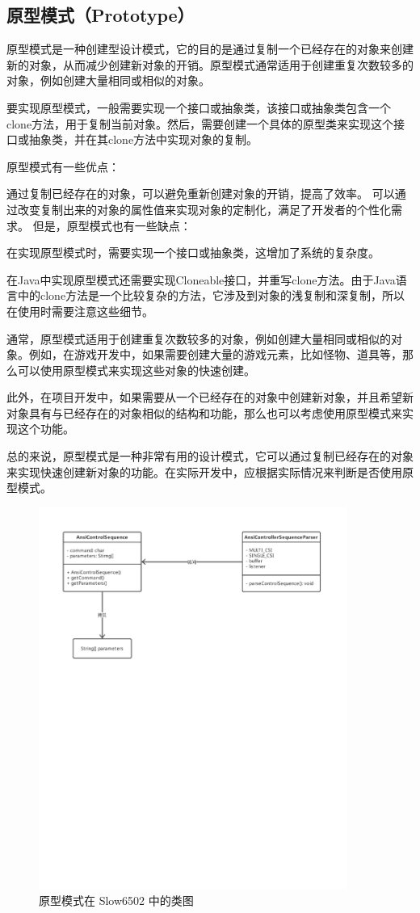 \subsection{原型模式（Prototype）}

原型模式是一种创建型设计模式，它的目的是通过复制一个已经存在的对象来创建新的对象，从而减少创建新对象的开销。原型模式通常适用于创建重复次数较多的对象，例如创建大量相同或相似的对象。

要实现原型模式，一般需要实现一个接口或抽象类，该接口或抽象类包含一个clone方法，用于复制当前对象。然后，需要创建一个具体的原型类来实现这个接口或抽象类，并在其clone方法中实现对象的复制。

原型模式有一些优点：

通过复制已经存在的对象，可以避免重新创建对象的开销，提高了效率。
可以通过改变复制出来的对象的属性值来实现对象的定制化，满足了开发者的个性化需求。
但是，原型模式也有一些缺点：

在实现原型模式时，需要实现一个接口或抽象类，这增加了系统的复杂度。

在Java中实现原型模式还需要实现Cloneable接口，并重写clone方法。由于Java语言中的clone方法是一个比较复杂的方法，它涉及到对象的浅复制和深复制，所以在使用时需要注意这些细节。

通常，原型模式适用于创建重复次数较多的对象，例如创建大量相同或相似的对象。例如，在游戏开发中，如果需要创建大量的游戏元素，比如怪物、道具等，那么可以使用原型模式来实现这些对象的快速创建。

此外，在项目开发中，如果需要从一个已经存在的对象中创建新对象，并且希望新对象具有与已经存在的对象相似的结构和功能，那么也可以考虑使用原型模式来实现这个功能。

总的来说，原型模式是一种非常有用的设计模式，它可以通过复制已经存在的对象来实现快速创建新对象的功能。在实际开发中，应根据实际情况来判断是否使用原型模式。


\begin{figure}[htb]
    \centering
    \includegraphics[width=0.9\textwidth]{figures/原型模式.pdf}
    \caption{原型模式在 Slow6502 中的类图}
\end{figure}

